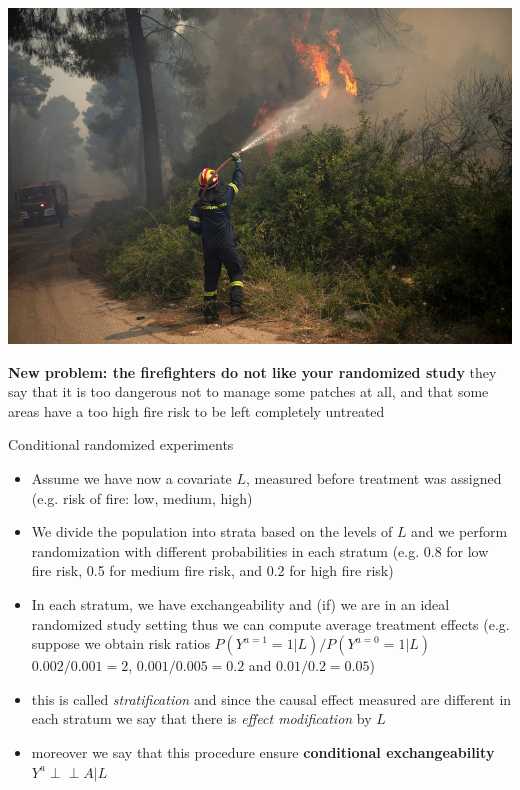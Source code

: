 \documentclass{beamer}
\newcommand{\indep}{\perp \!\!\! \perp}
\begin{document}
\begin{frame}
	\includegraphics[scale=0.2]{images/fire}

	\textbf{New problem: the firefighters do not like your randomized study} 
	they say that it is too dangerous not to manage some patches at all, and that some 
	areas have a too high fire risk to be left completely untreated 
\end{frame}

\begin{frame}{Conditional randomized experiments}
	\begin{itemize}
		\item<1-> Assume we have now a covariate $L$, measured before treatment was assigned  
			 (e.g. risk of fire: low, medium, high) 
		\item<2-> We divide the population into strata based on the levels of $L$ 
			and we perform randomization with different probabilities in each stratum 
			(e.g. 0.8 for low fire risk, 0.5 for medium fire risk, and 0.2 for high fire risk) 
		\item<3-> In each stratum, we have exchangeability and (if) we are in an 
			ideal randomized study setting thus we can compute 
			average treatment effects 
			(e.g. suppose we obtain risk ratios $P(Y^{a=1} = 1|L)/P(Y^{a=0} = 1|L)$ 
			$0.002/0.001 = 2 $, $0.001 / 0.005 = 0.2 $ and $0.01 / 0.2 = 0.05$) 
		\item<4-> this is called \emph{stratification} and since the causal effect measured are
			different in each stratum we say that there is \emph{effect modification} by $L$ 
		\item<5-> moreover we say that this procedure ensure \textbf{conditional exchangeability}                          $Y^a \indep A | L$ 
	\end{itemize}
\end{frame}
\end{document}
